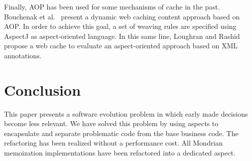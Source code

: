 \documentclass[preprint,10pt]{sigplanconf}
\newcommand{\ab}[1]{\nb{Alexandre}{blue}{#1}}
\newcommand{\sv}[1]{\nb{Santiago}{orange}{#1}}
\newcommand{\seclabel}[1]{\label{sec:#1}}
\begin{document}
Finally, AOP has been used for some mechanisms of cache in the past. Bouchenak et al.~\cite{Bouchenak2006} present a dynamic web caching content approach based on AOP. In order to achieve this goal, a set of weaving rules are specified using AspectJ as aspect-oriented language. In this same line, Loughran and Rashid~\cite{Loughran2004} propose a web cache to evaluate an aspect-oriented approach based on XML annotations. 


\section{Conclusion}\seclabel{conclusion}

This paper presents a software evolution problem in which early made decisions become less relevant. We have solved this problem by using aspects to encapsulate and separate problematic code from the base business code. The refactoring has been realized without a performance cost.
All Mondrian memoization implementations have been refactored into a dedicated aspect. %

%



\end{document}
